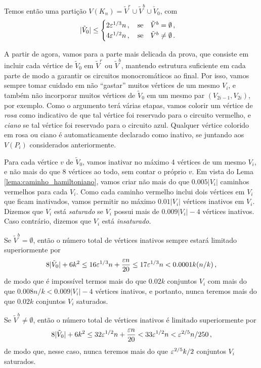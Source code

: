 Temos então uma partição $V(K_n) = \tilde{V}^r\cup\tilde{V}^b\cup\tilde{V}_0$, com
\[
	|\tilde{V}_0|\leq\begin{cases}
	2\varepsilon^{1/3}n\,, \quad \text{se}\quad \tilde{V}^b=\emptyset\,,\\
	4\varepsilon^{1/2}n\,, \quad \text{se}\quad \tilde{V}^b\neq\emptyset\,.
	\end{cases}
\]

A partir de agora, vamos para a parte mais delicada da prova, que consiste em incluir cada vértice de $\tilde{V}_0$ em $\tilde{V}^r$ ou $\tilde{V}^b$, mantendo estrutura suficiente em cada parte de modo a garantir os circuitos monocromáticos ao final. Por isso, vamos sempre tomar cuidado em não ``gastar'' muitos vértices de um mesmo $V_i$, e também não incorporar muitos vértices de $\tilde{V}_0$ em um mesmo par $(V_{2i-1}, V_{2i})$, por exemplo. Como o argumento terá várias etapas, vamos colorir um vértice de \emph{rosa} como indicativo de que tal vértice foi reservado para o circuito vermelho, e \emph{ciano} se tal vértice foi reservado para o circuito azul. Qualquer vértice colorido em rosa ou ciano é automaticamente declarado como inativo, se juntando aos $V(P_i)$ considerados anteriormente.

Para cada vértice $v$ de $\tilde{V}_0$, vamos inativar no máximo 4 vértices de um mesmo $V_i$, e não mais do que 8 vértices ao todo, sem contar o próprio $v$. Em vista do Lema \ref{lema:caminho_hamiltoniano}, vamos criar não mais do que $0.005|V_i|$ caminhos vermelhos para cada $V_i$. Como cada caminho vermelho inclui dois vértices em $V_i$ que ficam inativados, vamos permitir no máximo $0.01|V_i|$ vértices inativos em $V_i$. Dizemos que $V_i$ está \emph{saturado} se $V_i$ possui mais de $0.009|V_i| - 4$ vértices inativos. Caso contrário, dizemos que $V_i$ está \emph{insaturado}.

Se $\tilde{V}^b = \emptyset$, então o número total de vértices inativos sempre estará limitado superiormente por 
\[
	8|\tilde{V}_0| + 6k^2 \leq 16\varepsilon^{1/3}n + \frac{\varepsilon n}{20} \leq 17\varepsilon^{1/3}n < 0.0001k(n/k)\,,
\]
de modo que é impossível termos mais do que $0.02k$ conjuntos $V_i$ com mais do que $0.008n/k < 0.009|V_i| - 4$ vértices inativos, e portanto, nunca teremos mais do que $0.02k$ conjuntos $V_i$ saturados.

Se $\tilde{V}^b\neq\emptyset$, então o número total de vértices inativos é limitado superiormente por 
\[
	8|\tilde{V}_0| + 6k^2 \leq 32\varepsilon^{1/2}n + \frac{\varepsilon n}{20} < 33\varepsilon^{1/2}n < \varepsilon^{2/5}n/250\,,
\] 
de modo que, nesse caso, nunca teremos mais do que $\varepsilon^{2/5}k/2$ conjuntos $V_i$ saturados. 

